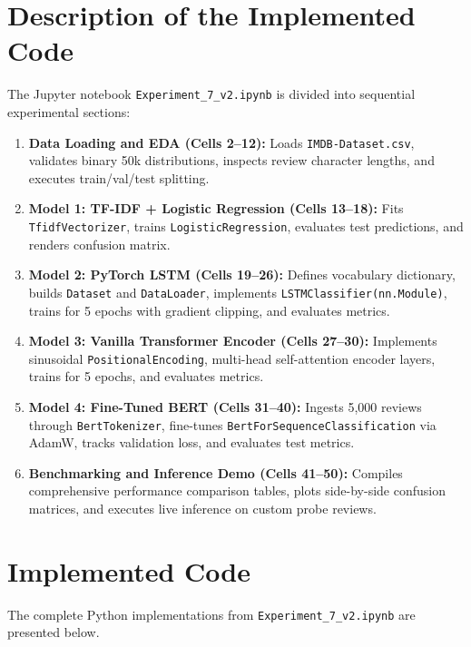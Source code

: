 \section{Description of the Implemented Code}
The Jupyter notebook \texttt{Experiment\_7\_v2.ipynb} is divided into sequential experimental sections:
\begin{enumerate}
    \item \textbf{Data Loading and EDA (Cells 2--12):} Loads \texttt{IMDB-Dataset.csv}, validates binary 50k distributions, inspects review character lengths, and executes train/val/test splitting.
    \item \textbf{Model 1: TF-IDF + Logistic Regression (Cells 13--18):} Fits \texttt{TfidfVectorizer}, trains \texttt{LogisticRegression}, evaluates test predictions, and renders confusion matrix.
    \item \textbf{Model 2: PyTorch LSTM (Cells 19--26):} Defines vocabulary dictionary, builds \texttt{Dataset} and \texttt{DataLoader}, implements \texttt{LSTMClassifier(nn.Module)}, trains for 5 epochs with gradient clipping, and evaluates metrics.
    \item \textbf{Model 3: Vanilla Transformer Encoder (Cells 27--30):} Implements sinusoidal \texttt{PositionalEncoding}, multi-head self-attention encoder layers, trains for 5 epochs, and evaluates metrics.
    \item \textbf{Model 4: Fine-Tuned BERT (Cells 31--40):} Ingests 5,000 reviews through \texttt{BertTokenizer}, fine-tunes \texttt{BertForSequenceClassification} via AdamW, tracks validation loss, and evaluates test metrics.
    \item \textbf{Benchmarking and Inference Demo (Cells 41--50):} Compiles comprehensive performance comparison tables, plots side-by-side confusion matrices, and executes live inference on custom probe reviews.
\end{enumerate}

\section{Implemented Code}
The complete Python implementations from \texttt{Experiment\_7\_v2.ipynb} are presented below.

